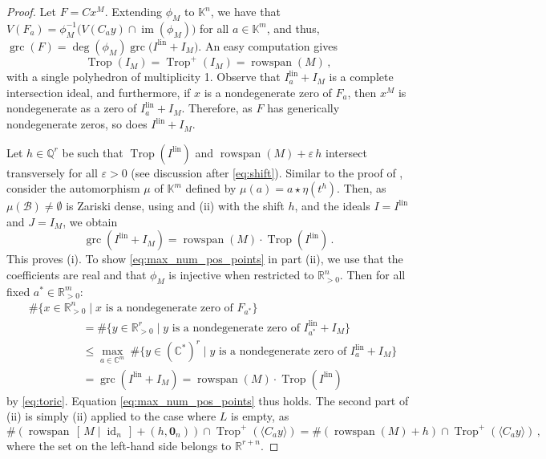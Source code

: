 \documentclass[11pt,reqno,a4paper]{amsart}
\numberwithin{equation}{section}
\theoremstyle{theoremstyle}
\theoremstyle{examplestyle}
\newcommand{\CC}{\mathbb{C}}
\newcommand{\RR}{\mathbb{R}}
\newcommand{\QQ}{\mathbb{Q}}
\newcommand{\lin}{{\mathrm{lin}}}
\DeclareMathOperator{\grc}{grc}
\DeclareMathOperator{\rowspan}{rowspan}
\DeclareMathOperator{\id}{id}
\DeclareMathOperator{\im}{im}
\DeclareMathOperator{\Trop}{Trop}
\begin{document}
\begin{proof} 
Let $F=C x^M$. 
Extending $\phi_M$ to $\mathbb{K}^n$,  we have that
$V( F_a )=\phi_M^{-1}\big( V(C_a y) \cap \im(\phi_M)\big)$ for all  
$a\in \mathbb{K}^m$, 
and thus, $\grc ( F) = \deg(\phi_M)  \grc\big(I^{\lin} + I_M \big)$.
An easy computation gives
\[\Trop(I_M)= \Trop^+(I_M)= \rowspan(M)\,, \]
with a single polyhedron of multiplicity 1. 
Observe that 
$I^{\lin}_a + I_M$ is a complete intersection ideal, and furthermore, 
if $x$ is a nondegenerate zero of $F_a$, then $x^M$ is nondegenerate as a zero of 
$I^{\lin}_a + I_M$. Therefore, 
as $F$ has generically nondegenerate zeros, so does $I^{\lin} + I_M$. 

Let $h\in \QQ^r$ be such that $\Trop(I^{\lin})$ and $\rowspan(M)+ \varepsilon\, h$
intersect transversely  for all $\varepsilon>0$ (see discussion after \eqref{eq:shift}). 
Similar to the proof of , 
consider the automorphism $\mu$ of $\mathbb{K}^m$ defined by $\mu(a)=a\star \eta(t^h)$. Then, as $\mu(\mathcal{B})   \neq \emptyset$ is Zariski dense,  
using   and  (ii) with the shift $h$, and the ideals $I=I^{\lin}$ and $J=I_M$, we obtain
\begin{equation}\label{eq:toric}
\grc (I^{\lin}+ I_M) =  \rowspan(M)\cdot \Trop(I^{\lin})\, .
\end{equation}
This proves (i). 
To show \eqref{eq:max_num_pos_points} in part (ii), we use that the coefficients are real and that $\phi_M$ is injective when restricted to $\RR^n_{>0}$. Then  for all fixed $a^*\in \RR^m_{>0}$: 
\begin{align*}
&\#\big \{x\in \RR^n_{>0} \mid x  \text{ is a nondegenerate zero of }F_{a^*} \big\}  \\
&\hspace{2cm} =\# \{y\in \RR^r_{>0} \mid y  \text{ is a nondegenerate zero of } I_{a^*}^{\lin} + I_M  \} \\ 
&\hspace{2cm}\leq  \max_{a\in \CC^m} \ \# \{y \in (\CC^*)^r \mid y  \text{ is a nondegenerate zero of } I^{\lin}_{a} +I_M  \} \\
&\hspace{2cm}=\grc ( I^{\lin} + I_M)=\rowspan(M)\cdot \Trop(I^{\lin}) 
\end{align*}
by \eqref{eq:toric}. Equation \eqref{eq:max_num_pos_points}  thus holds.  
The second part of (ii) is simply  (ii) 
 applied to the case where $L$ is empty, 
 as 
\[ \# (\rowspan\,[\,M\mid \id_n\,]+(h,\mathbf{0}_{n} ))\cap \Trop^+(\langle C_a y  \rangle) =\# (\rowspan(M)+h) \cap \Trop^+(\langle C_a y   \rangle)  \, , \]
where the set on the left-hand side belongs to $\RR^{r+n}$. 
\end{proof}
\end{document}
